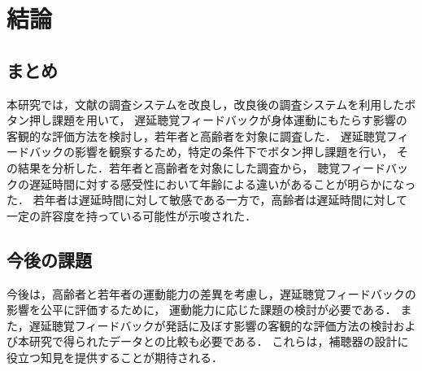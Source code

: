 \section{結論}
\subsection{まとめ}
本研究では，文献\cite{cf:shigematu}の調査システムを改良し，改良後の調査システムを利用したボタン押し課題を用いて，
遅延聴覚フィードバックが身体運動にもたらす影響の客観的な評価方法を検討し，若年者と高齢者を対象に調査した．
遅延聴覚フィードバックの影響を観察するため，特定の条件下でボタン押し課題を行い，
その結果を分析した．若年者と高齢者を対象にした調査から，
聴覚フィードバックの遅延時間に対する感受性において年齢による違いがあることが明らかになった．
若年者は遅延時間に対して敏感である一方で，高齢者は遅延時間に対して一定の許容度を持っている可能性が示唆された．
\subsection{今後の課題}
今後は，高齢者と若年者の運動能力の差異を考慮し，遅延聴覚フィードバックの影響を公平に評価するために，
運動能力に応じた課題の検討が必要である．
また，遅延聴覚フィードバックが発話に及ぼす影響の客観的な評価方法の検討および本研究で得られたデータとの比較も必要である．
これらは，補聴器の設計に役立つ知見を提供することが期待される．